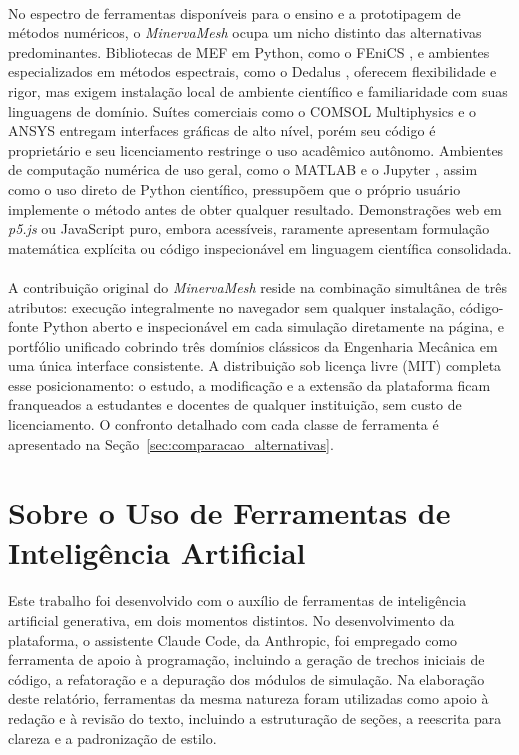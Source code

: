 \paragraph{}No espectro de ferramentas disponíveis para o ensino e a prototipagem de métodos numéricos, o \textit{MinervaMesh} ocupa um nicho distinto das alternativas predominantes. Bibliotecas de MEF em Python, como o FEniCS \cite{Alnaes2015}, e ambientes especializados em métodos espectrais, como o Dedalus \cite{Burns2020}, oferecem flexibilidade e rigor, mas exigem instalação local de ambiente científico e familiaridade com suas linguagens de domínio. Suítes comerciais como o COMSOL Multiphysics \cite{COMSOL} e o ANSYS \cite{ANSYS} entregam interfaces gráficas de alto nível, porém seu código é proprietário e seu licenciamento restringe o uso acadêmico autônomo. Ambientes de computação numérica de uso geral, como o MATLAB \cite{MATLAB} e o Jupyter \cite{Kluyver2016}, assim como o uso direto de Python científico, pressupõem que o próprio usuário implemente o método antes de obter qualquer resultado. Demonstrações web em \textit{p5.js} \cite{P5js} ou JavaScript puro, embora acessíveis, raramente apresentam formulação matemática explícita ou código inspecionável em linguagem científica consolidada.

\paragraph{}A contribuição original do \textit{MinervaMesh} reside na combinação simultânea de três atributos: execução integralmente no navegador sem qualquer instalação, código-fonte Python aberto e inspecionável em cada simulação diretamente na página, e portfólio unificado cobrindo três domínios clássicos da Engenharia Mecânica em uma única interface consistente. A distribuição sob licença livre (MIT) completa esse posicionamento: o estudo, a modificação e a extensão da plataforma ficam franqueados a estudantes e docentes de qualquer instituição, sem custo de licenciamento. O confronto detalhado com cada classe de ferramenta é apresentado na Seção~\ref{sec:comparacao_alternativas}.

\section{Sobre o Uso de Ferramentas de Inteligência Artificial}
\label{sec:uso_ia}

\paragraph{}Este trabalho foi desenvolvido com o auxílio de ferramentas de inteligência artificial generativa, em dois momentos distintos. No desenvolvimento da plataforma, o assistente Claude Code, da Anthropic, foi empregado como ferramenta de apoio à programação, incluindo a geração de trechos iniciais de código, a refatoração e a depuração dos módulos de simulação. Na elaboração deste relatório, ferramentas da mesma natureza foram utilizadas como apoio à redação e à revisão do texto, incluindo a estruturação de seções, a reescrita para clareza e a padronização de estilo.

